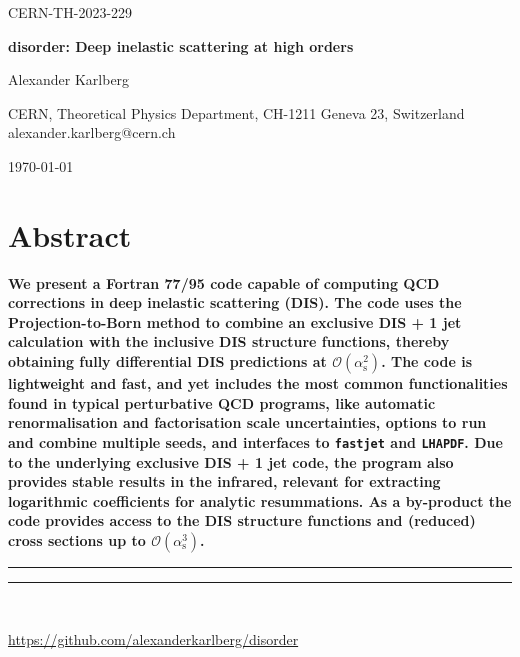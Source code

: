 \documentclass[submission, PhysCodeb]{SciPost}
\newcommand{\fastjet}{{\tt fastjet}}
\newcommand{\lhapdf}{{\tt LHAPDF}}
\newcommand{\as}{\alpha_{\mathrm{s}}}
\begin{document}
\begin{flushright}
CERN-TH-2023-229
\end{flushright}
\begin{center}{\Large \textbf{
disorder: Deep inelastic scattering at high orders\\
}}\end{center}

\begin{center}
Alexander Karlberg
\end{center}

\begin{center}
CERN, Theoretical Physics Department, CH-1211 Geneva 23, Switzerland
\\
{\small \sf alexander.karlberg@cern.ch}
\end{center}

\begin{center}
\today
\end{center}


\section*{Abstract}
{\bf
We present a Fortran 77/95 code capable of computing QCD corrections
in deep inelastic scattering (DIS). The code uses the
Projection-to-Born method to combine an exclusive DIS + 1 jet
calculation with the inclusive DIS structure functions, thereby
obtaining fully differential DIS predictions at
$\mathcal{O}(\as^2)$. The code is lightweight and fast, and yet
includes the most common functionalities found in typical perturbative
QCD programs, like automatic renormalisation and factorisation scale
uncertainties, options to run and combine multiple seeds, and
interfaces to \fastjet{} and \lhapdf{}. Due to the underlying
exclusive DIS + 1 jet code, the program also provides stable results
in the infrared, relevant for extracting logarithmic coefficients for
analytic resummations. As a by-product the code provides access
to the DIS structure functions and (reduced) cross sections up to
$\mathcal{O}(\as^3)$.}


\vspace{10pt}
\noindent\rule{\textwidth}{1pt}
\tableofcontents\thispagestyle{fancy}
\noindent\rule{\textwidth}{1pt}
\vspace{10pt}\\
\begin{center}\url{https://github.com/alexanderkarlberg/disorder}\end{center}
\newpage
\end{document}
